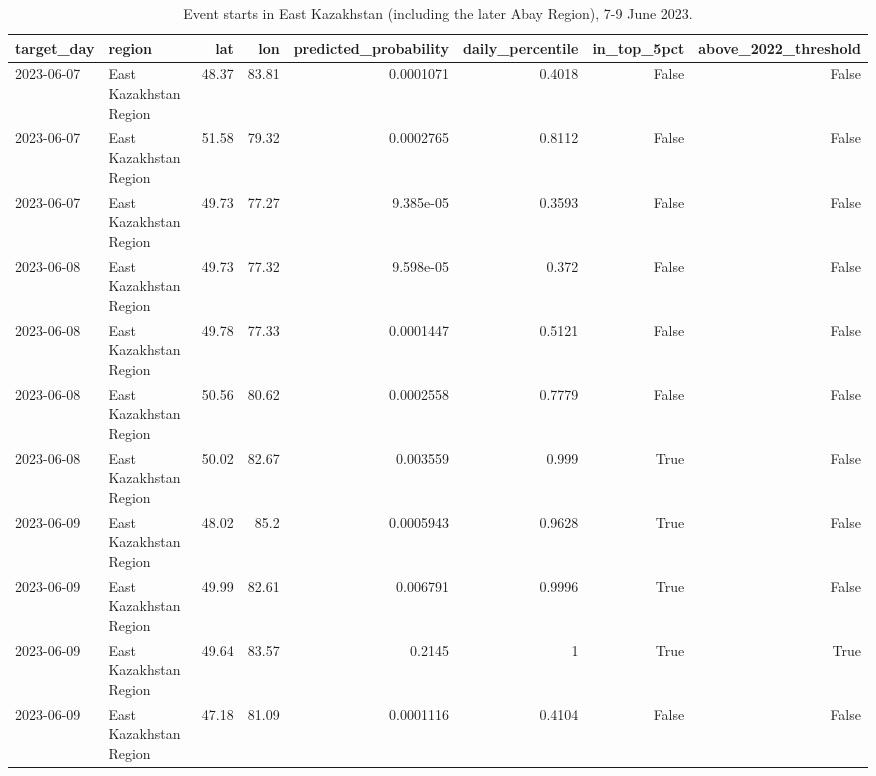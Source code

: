 \begin{table}
\caption{Event starts in East Kazakhstan (including the later Abay Region), 7-9 June 2023.}
\label{tab:T15b_case_june_2023_east}
\begin{tabular}{llrrrrrr}
\toprule
target_day & region & lat & lon & predicted_probability & daily_percentile & in_top_5pct & above_2022_threshold \\
\midrule
2023-06-07 & East Kazakhstan Region & 48.37 & 83.81 & 0.0001071 & 0.4018 & False & False \\
2023-06-07 & East Kazakhstan Region & 51.58 & 79.32 & 0.0002765 & 0.8112 & False & False \\
2023-06-07 & East Kazakhstan Region & 49.73 & 77.27 & 9.385e-05 & 0.3593 & False & False \\
2023-06-08 & East Kazakhstan Region & 49.73 & 77.32 & 9.598e-05 & 0.372 & False & False \\
2023-06-08 & East Kazakhstan Region & 49.78 & 77.33 & 0.0001447 & 0.5121 & False & False \\
2023-06-08 & East Kazakhstan Region & 50.56 & 80.62 & 0.0002558 & 0.7779 & False & False \\
2023-06-08 & East Kazakhstan Region & 50.02 & 82.67 & 0.003559 & 0.999 & True & False \\
2023-06-09 & East Kazakhstan Region & 48.02 & 85.2 & 0.0005943 & 0.9628 & True & False \\
2023-06-09 & East Kazakhstan Region & 49.99 & 82.61 & 0.006791 & 0.9996 & True & False \\
2023-06-09 & East Kazakhstan Region & 49.64 & 83.57 & 0.2145 & 1 & True & True \\
2023-06-09 & East Kazakhstan Region & 47.18 & 81.09 & 0.0001116 & 0.4104 & False & False \\
\bottomrule
\end{tabular}
\end{table}
